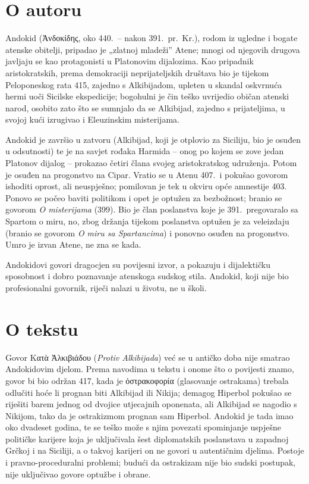 \section*{O autoru}

Andokid (Ἀνδοκίδης, oko 440.\ – nakon 391.\ pr.~Kr.), rodom iz ugledne i bogate atenske obitelji, pripadao je „zlatnoj mladeži” Atene; mnogi od njegovih drugova javljaju se kao protagonisti u Platonovim dijalozima. Kao pripadnik aristokratskih, prema demokraciji neprijateljskih društava bio je tijekom Peloponeskog rata 415, zajedno s Alkibijadom, upleten u skandal oskvrnuća hermi uoči Sicilske ekspedicije; bogohulni je čin teško uvrijedio običan atenski narod, osobito zato što se sumnjalo da se Alkibijad, zajedno s prijateljima, u svojoj kući izrugivao i Eleuzinskim misterijama.

Andokid je završio u zatvoru (Alkibijad, koji je otplovio za Siciliju, bio je osuđen u odsutnosti) te je na savjet rođaka Harmida – onog po kojem se zove jedan Platonov dijalog – prokazao četiri člana svojeg aristokratskog udruženja. Potom je osuđen na progonstvo na Cipar. Vratio se u Atenu 407.\ i pokušao govorom ishoditi oprost, ali neuspješno; pomilovan je tek u okviru opće amnestije 403. Ponovo se počeo baviti politikom i opet je optužen za bezbožnost; branio se govorom \textit{O misterijama} (399). Bio je član poslanstva koje je 391.\ pregovaralo sa Spartom o miru, no, zbog držanja tijekom poslanstva optužen je za veleizdaju (branio se govorom \textit{O miru sa Spartancima}) i ponovno osuđen na progonstvo. Umro je izvan Atene, ne zna se kada.

Andokidovi govori dragocjen su povijesni izvor, a pokazuju i dijalektičku sposobnost i dobro poznavanje atenskoga sudskog stila. Andokid, koji nije bio profesionalni govornik, riječi nalazi u životu, ne u školi.

\section*{O tekstu}

Govor Κατὰ Ἀλκιβιάδου (\textit{Protiv Alkibijada}) već se u antičko doba nije smatrao Andokidovim djelom. Prema navodima u tekstu i onome što o povijesti znamo, govor bi bio održan 417, kada je ὀστρακοφορία (glasovanje ostrakama) trebala odlučiti hoće li prognan biti Alkibijad ili Nikija; demagog Hiperbol pokušao se riješiti barem jednog od dvojice utjecajnih oponenata, ali Alkibijad se nagodio s Nikijom, tako da je ostrakizmom prognan sam Hiperbol. Andokid je tada imao oko dvadeset godina, te se teško može s njim povezati spominjanje uspješne političke karijere koja je uključivala šest diplomatskih poslanstava u zapadnoj Grčkoj i na Siciliji, a o takvoj karijeri on ne govori u autentičnim djelima. Postoje i pravno-proceduralni problemi; budući da ostrakizam nije bio sudski postupak, nije uključivao govore optužbe i obrane.

